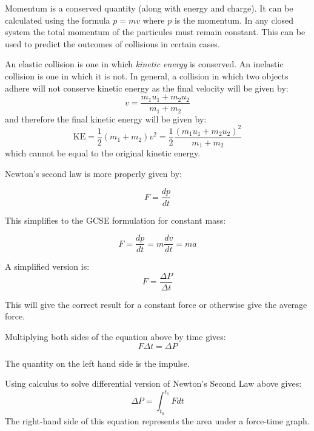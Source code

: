 \documentclass[main.tex]{subfiles}
\begin{document}

Momentum is a conserved quantity (along with energy and charge). It can be calculated using the formula $p=mv$ where $p$ is the momentum. In any closed system the total momentum of the particules must remain constant. This can be used to predict the outcomes of collisions in certain cases.


An elastic collision is one in which \emph{kinetic energy} is conserved. An inelastic collision is one in which it is not. In general, a collision in which two objects adhere will not conserve kinetic energy as the final velocity will be given by:
$$ v = \frac{m_1u_1+m_2u_2}{m_1+m_2} $$
and therefore the final kinetic energy will be given by:
\[ \text{KE} = \frac{1}{2}(m_1+m_2)v^2 = \frac{1}{2}\frac{\left( m_1u_1+m_2u_2\right)^2}{m_1+m_2}\]
which cannot be equal to the original kinetic energy.


Newton's second law is more properly given by:

\[ F = \frac{dp}{dt} \]

This simplifies to the GCSE formulation for constant mass:

\[ F = \frac{dp}{dt} = m\frac{dv}{dt} = ma \]

A simplified version is:
$$F = \frac{\Delta P}{\Delta t}$$

This will give the correct result for a constant force or otherwise give the average force.


Multiplying both sides of the equation above by time gives:
$$ F \Delta t = \Delta P $$

The quantity on the left hand side is the impulse.


Using calculus to solve differential version of Newton's Second Law above gives:
$$ \Delta P = \int_{t_0}^{t_1} F dt $$
The right-hand side of this equation represents the area under a force-time graph.
\end{document}
